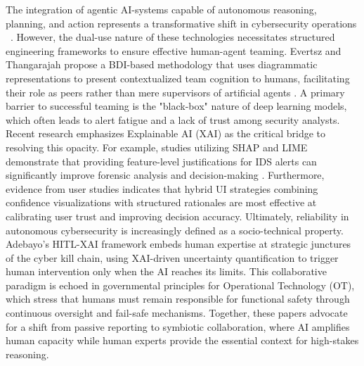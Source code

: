 The integration of agentic AI-systems capable of autonomous reasoning, planning, and action represents a transformative shift in cybersecurity operations ~\cite{lazer2026surveyagenticaicybersecurity}. 
However, the dual-use nature of these technologies necessitates structured engineering frameworks to ensure effective human-agent teaming. 
Evertsz and Thangarajah propose a BDI-based methodology that uses diagrammatic representations to present contextualized team cognition to humans, facilitating their role as peers rather than mere supervisors of artificial agents \cite{evertsz2020framework}. 
A primary barrier to successful teaming is the "black-box" nature of deep learning models, which often leads to alert fatigue and a lack of trust among security analysts. 
Recent research emphasizes Explainable AI (XAI) \cite{kalimuthu2025explainable} as the critical bridge to resolving this opacity. 
For example, studies utilizing SHAP and LIME demonstrate that providing feature-level justifications for IDS alerts can significantly improve forensic analysis and decision-making \cite{kalimuthu2025explainable}. 
Furthermore, evidence from user studies indicates that hybrid UI strategies combining confidence visualizations with structured rationales are most effective at calibrating user trust and improving decision accuracy. 
Ultimately, reliability in autonomous cybersecurity is increasingly defined as a socio-technical property. 
Adebayo’s HITL-XAI framework \cite{adebayo2026human} embeds human expertise at strategic junctures of the cyber kill chain, using XAI-driven uncertainty quantification to trigger human intervention only when the AI reaches its limits.
This collaborative paradigm is echoed in governmental principles for Operational Technology (OT), which stress that humans must remain responsible for functional safety through continuous oversight and fail-safe mechanisms. 
Together, these papers advocate for a shift from passive reporting to symbiotic collaboration, where AI amplifies human capacity while human experts provide the essential context for high-stakes reasoning.